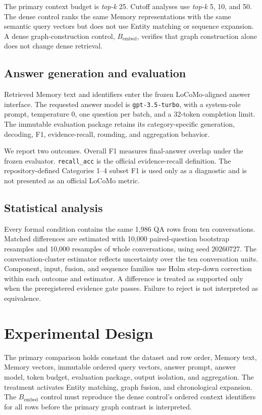 \documentclass[10pt,twocolumn]{article}
\newcommand{\recallacc}{\texttt{recall\_acc}}
\newcommand{\bembed}{B_{\mathrm{embed}}}
\newcommand{\topk}{\textit{top-k}}
\begin{document}
The primary context budget is \topk{} 25. Cutoff analyses use \topk{} 5, 10,
and 50. The dense control ranks the same Memory representations with the same
semantic query vectors but does not use Entity matching or sequence expansion.
A dense graph-construction control, \(\bembed\), verifies that graph
construction alone does not change dense retrieval.

\subsection{Answer generation and evaluation}

Retrieved Memory text and identifiers enter the frozen LoCoMo-aligned answer
interface. The requested answer model is \texttt{gpt-3.5-turbo}, with a
system-role prompt, temperature 0, one question per batch, and a 32-token
completion limit. The immutable evaluation package retains its
category-specific generation, decoding, F1, evidence-recall, rounding, and
aggregation behavior.

We report two outcomes. Overall F1 measures final-answer overlap under the
frozen evaluator. \recallacc{} is the official evidence-recall definition.
The repository-defined Categories 1--4 subset F1 is used only as a diagnostic
and is not presented as an official LoCoMo metric.

\subsection{Statistical analysis}

Every formal condition contains the same 1,986 QA rows from ten conversations.
Matched differences are estimated with 10,000 paired-question bootstrap
resamples and 10,000 resamples of whole conversations, using seed 20260727.
The conversation-cluster estimator reflects uncertainty over the ten
conversation units. Component, input, fusion, and sequence families use Holm
step-down correction within each outcome and estimator. A difference is
treated as supported only when the preregistered evidence gate passes. Failure
to reject is not interpreted as equivalence.

\section{Experimental Design}

The primary comparison holds constant the dataset and row order, Memory text,
Memory vectors, immutable ordered query vectors, answer prompt, answer model,
token budget, evaluation package, output isolation, and aggregation. The
treatment activates Entity matching, graph fusion, and chronological
expansion. The \(\bembed\) control must reproduce the dense control's ordered
context identifiers for all rows before the primary graph contrast is
interpreted.
\end{document}
